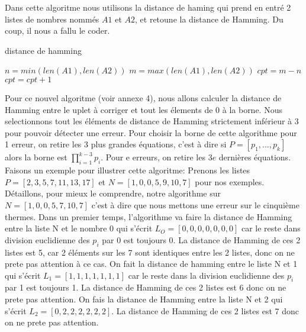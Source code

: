 \documentclass[a4paper, 11pt]{report}
\begin{document}
Dans cette algoritme nous utilisons la distance de haming qui prend en entré 2 listes de nombres nommés $A1$ et $A2$, et retoune la distance de Hamming. Du coup, il nous a fallu le coder. \newline
\begin{algorithm}
    \caption{distance de hamming}
    \begin{algorithmic}
        \STATE $n=min(len(A1),len(A2))$
        \STATE $m=max(len(A1),len(A2))$
        \STATE $cpt=m-n$
        \STATE $cpt=cpt+1$
        \ENDIF
        \ENDFOR
    \end{algorithmic}
\end{algorithm}

Pour ce nouvel algoritme (voir annexe 4), nous allons calculer la distance de Hamming entre le uplet à corriger et tout les élements de 0 à la borne. Nous selectionnons tout les éléments de distance de Hamming strictement inférieur à 3 pour pouvoir détecter une erreur. \newline
Pour choisir la borne de cette algorithme pour 1 erreur, on retire les 3 plus grandes équations, c'est à dire si $P=[p_1, ..., p_k]$ alors la borne est $\prod_{i=1} ^{k-3} p_i$. Pour e erreurs, on retire les $3e$ dernières équations. \newline
Faisons un exemple pour illustrer cette algoritme: \newline
Prenons les listes $P=[2,3,5,7,11,13,17]$ et $N=[1,0,0,5,9,10,7]$ pour nos exemples. \newline
Détaillons, pour mieux le comprendre, notre algorithme sur $N=[1,0,0,5,7,10,7]$ c'est à dire que nous mettons une erreur sur le cinquième thermes.
Dans un premier temps, l'algorithme va faire la distance de Hamming entre la liste N et le nombre 0 qui s'écrit $L_O=[0,0,0,0,0,0,0]$ car le reste dans division euclidienne des $p_i$ par 0 est toujours 0.
La distance de Hamming de ces 2 listes est 5, car 2 éléments sur les 7 sont identiques entre les 2 listes, donc on ne prete pas attention à ce cas. \newline
On fait la distance de hamming entre le liste N et 1 qui s'écrit $L_1=[1,1,1,1,1,1,1]$ car le reste dans la division euclidienne des $p_i$ par 1 est toujours 1.
La distance de Hamming de ces 2 listes est 6 donc on ne prete pas attention.
On fais la distance de Hamming entre la liste N et 2 qui s'écrit $L_2=[0,2,2,2,2,2,2]$. La distance de Hamming de ces 2 listes est 7 donc on ne prete pas attention. \newline
\end{document}
